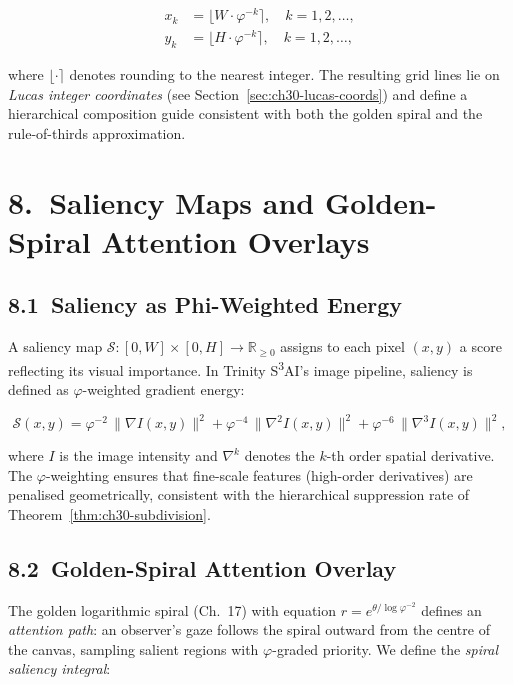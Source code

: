 \begin{align*}
  x_k &= \lfloor W \cdot \varphi^{-k} \rceil,
    \quad k = 1, 2, \ldots, \\
  y_k &= \lfloor H \cdot \varphi^{-k} \rceil,
    \quad k = 1, 2, \ldots,
\end{align*}

where $\lfloor \cdot \rceil$ denotes rounding to
the nearest integer.  The resulting grid lines
lie on \emph{Lucas integer coordinates} (see
Section~\ref{sec:ch30-lucas-coords}) and define
a hierarchical composition guide consistent with
both the golden spiral and the rule-of-thirds
approximation.

\section{8.\ Saliency Maps and Golden-Spiral
  Attention Overlays}\label{sec:ch30-saliency}

\subsection{8.1\ Saliency as Phi-Weighted
  Energy}\label{subsec:ch30-saliency-energy}

A saliency map $\mathcal{S} : [0,W] \times [0,H]
\to \mathbb{R}_{\geq 0}$ assigns to each pixel
$(x, y)$ a score reflecting its visual
importance.  In Trinity S\textsuperscript{3}AI's
image pipeline, saliency is defined as
$\varphi$-weighted gradient energy:

\[\mathcal{S}(x, y) = \varphi^{-2}\,
  \|\nabla I(x, y)\|^2
  + \varphi^{-4}\,\|\nabla^2 I(x, y)\|^2
  + \varphi^{-6}\,\|\nabla^3 I(x, y)\|^2,\]

where $I$ is the image intensity and
$\nabla^k$ denotes the $k$-th order spatial
derivative.  The $\varphi$-weighting ensures
that fine-scale features (high-order derivatives)
are penalised geometrically, consistent with
the hierarchical suppression rate of
Theorem~\ref{thm:ch30-subdivision}.

\subsection{8.2\ Golden-Spiral Attention
  Overlay}\label{subsec:ch30-spiral-overlay}

The golden logarithmic spiral (Ch.~17) with
equation $r = e^{\theta/\log\varphi^{-2}}$
defines an \emph{attention path}: an
observer's gaze follows the spiral outward from
the centre of the canvas, sampling salient regions
with $\varphi$-graded priority.  We define the
\emph{spiral saliency integral}:

